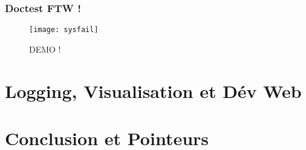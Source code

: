 \documentclass{beamer}
\begin{document}
\begin{frame}
  \frametitle{Doctest FTW !}

  \begin{figure}[!h]
    \centering
    \texttt{[image: sysfail]}
    \caption{DEMO !}
    \label{fig:doctestdemo}
  \end{figure}
\end{frame}


\section{Logging, Visualisation et Dév Web}
\label{sec:libraries}


\section{Conclusion et Pointeurs}
\label{sec:conclusion}

\end{document}
